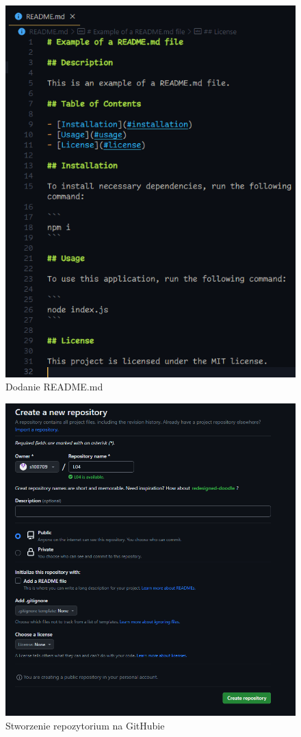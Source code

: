 \documentclass{article} %
\begin{document}
\begin{figure}
	\centering
	\includegraphics[width=1\textwidth]{image/git/23.png}
	\caption{Dodanie README.md}
\end{figure}

\begin{figure}
	\centering
	\includegraphics[width=1\textwidth]{image/git/24.png}
	\caption{Stworzenie repozytorium na GitHubie}
\end{figure}
\end{document}
